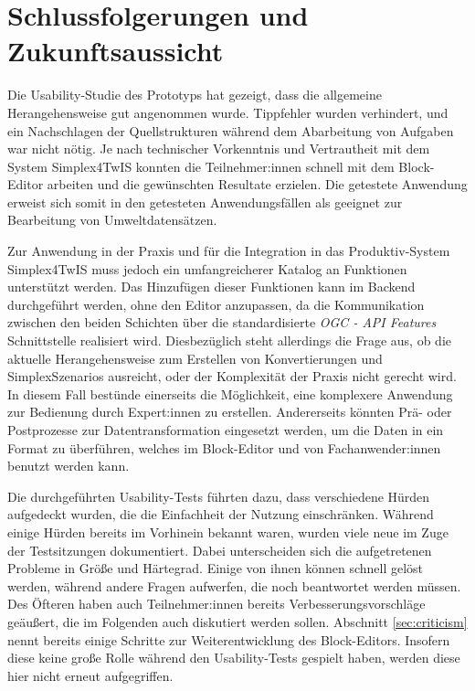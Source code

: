 \newcommand{\qref}[2]{(Vgl. \hyperref[#2]{\ref*{sec:qualitative}, \textbf{#1}})}
\section{Schlussfolgerungen und Zukunftsaussicht}

Die Usability-Studie des Prototyps hat gezeigt, dass die allgemeine Herangehensweise gut angenommen wurde. Tippfehler wurden verhindert, und ein Nachschlagen der Quellstrukturen während dem Abarbeitung von Aufgaben war nicht nötig. Je nach technischer Vorkenntnis und Vertrautheit mit dem System Simplex4TwIS konnten die Teilnehmer:innen schnell mit dem Block-Editor arbeiten und die gewünschten Resultate erzielen. Die getestete Anwendung erweist sich somit in den getesteten Anwendungsfällen als geeignet zur Bearbeitung von Umweltdatensätzen.

Zur Anwendung in der Praxis und für die Integration in das Produktiv-System Simplex4TwIS muss jedoch ein umfangreicherer Katalog an Funktionen unterstützt werden. Das Hinzufügen dieser Funktionen kann im Backend durchgeführt werden, ohne den Editor anzupassen, da die Kommunikation zwischen den beiden Schichten über die standardisierte \textit{OGC - API Features} Schnittstelle realisiert wird. Diesbezüglich steht allerdings die Frage aus, ob die aktuelle Herangehensweise zum Erstellen von Konvertierungen und SimplexSzenarios ausreicht, oder der Komplexität der Praxis nicht gerecht wird. In diesem Fall bestünde einerseits die Möglichkeit, eine komplexere Anwendung zur Bedienung durch Expert:innen zu erstellen. Andererseits könnten Prä- oder Postprozesse zur Datentransformation eingesetzt werden, um die Daten in ein Format zu überführen, welches im Block-Editor und von Fachanwender:innen benutzt werden kann.

Die durchgeführten Usability-Tests führten dazu, dass verschiedene Hürden aufgedeckt wurden, die die Einfachheit der Nutzung einschränken. Während einige Hürden bereits im Vorhinein bekannt waren, wurden viele neue im Zuge der Testsitzungen dokumentiert. Dabei unterscheiden sich die aufgetretenen Probleme in Größe und Härtegrad. Einige von ihnen können schnell gelöst werden, während andere Fragen aufwerfen, die noch beantwortet werden müssen. Des Öfteren haben auch Teilnehmer:innen bereits Verbesserungsvorschläge geäußert, die im Folgenden auch diskutiert werden sollen. Abschnitt \ref{sec:criticism} nennt bereits einige Schritte zur Weiterentwicklung des Block-Editors. Insofern diese keine große Rolle während den Usability-Tests gespielt haben, werden diese hier nicht erneut aufgegriffen.

